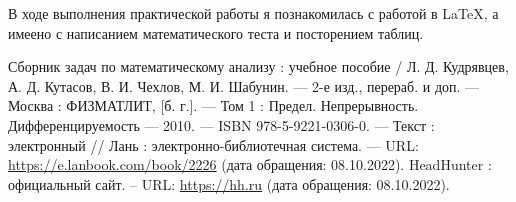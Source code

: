 \documentclass[14pt]{extreport}
\begin{document}
\conclusions

В ходе выполнения практической работы я познакомилась с работой в LaTeX, а имеено с написанием  математического теста и посторением таблиц.

\newpage
\begin{thebibliography}{99}
Сборник задач по математическому анализу : учебное пособие / Л. Д. Кудрявцев, А. Д. Кутасов, В. И. Чехлов, М. И. Шабунин. — 2-е изд., перераб. и доп. — Москва : ФИЗМАТЛИТ, [б. г.]. — Том 1 : Предел. Непрерывность. Дифференцируемость — 2010. — ISBN 978-5-9221-0306-0. — Текст : электронный // Лань : электронно-библиотечная система. — URL: \url{https://e.lanbook.com/book/2226} (дата обращения: 08.10.2022).
HeadHunter : официальный сайт. – URL: \url{https://hh.ru} (дата обращения: 08.10.2022).
\end{thebibliography}
\end{document}
